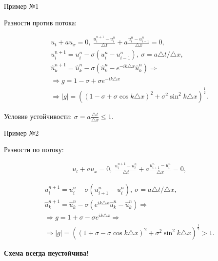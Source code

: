\documentclass[10pt,xcolor=pst,aspectratio=169]{beamer}
\begin{document}
\begin{frame}{Пример №1}

	\transdissolve[duration=0.1]
	\justifying
	\large

	Разности против потока:

	\[
		\begin{split}
			&u_{t} + a u_{x} = 0 , \: \frac{u^{n + 1}_{i} - u^{n}_{i}}{\triangle t} + a \frac{u^{n}_{i} - u^{n}_{i - 1}}{\triangle x} = 0 , \\
			&u^{n + 1}_{i} = u^{n}_{i} - \sigma \left( u^{n}_{i} - u^{n}_{i - 1} \right) , \: \sigma = a \triangle t / \triangle x , \\
			&\hat{u}^{n + 1}_{k} = \hat{u}^{n}_{k} - \sigma \left( \hat{u}^{n}_{k} - e^{- i k \triangle x} \hat{u}^{n}_{k} \right) \Rightarrow \\
			& \Rightarrow g = 1 - \sigma + \sigma e^{- i k \triangle x} \\
			& \Rightarrow |g| = \left( \left( 1 - \sigma + \sigma \cos k \triangle x \right)^{2} + \sigma^2 \sin^{2} k \triangle x \right)^{\frac{1}{2}}.
		\end{split}
	\]

    Условие устойчивости: $\sigma = a \frac{\triangle t}{\triangle x} \leq 1$.\\

\end{frame}

\begin{frame}{Пример №2}

	\transdissolve[duration=0.1]
	\justifying
	\large

	Разности по потоку:

	\[
		\begin{split}
			&u_{t} + a u_{x} = 0 , \: \frac{u^{n + 1}_{i} - u^{n}_{i}}{\triangle t} + a \frac{u^{n}_{i + 1} - u^{n}_{i}}{\triangle x} = 0,
		\end{split}
	\]

	\pause

	\[
		\begin{split}
			&u^{n + 1}_{i} = u^{n}_{i} - \sigma \left( u^{n}_{i + 1} - u^{n}_{i} \right), \: \sigma = a \triangle t / \triangle x, \\
			&\hat{u}^{n + 1}_{k} = \hat{u}^{n}_{k} - \sigma \left( e^{i k \triangle x} \hat{u}^{n}_{k} - \hat{u}^{n}_{k} \right) \Rightarrow \\
			& \Rightarrow g = 1 + \sigma - \sigma e^{i k \triangle x} \Rightarrow \\
			&\Rightarrow |g| = \left( \left( 1 + \sigma - \sigma \cos k \triangle x \right)^{2} + \sigma^2 \sin^{2} k \triangle x \right)^{\frac{1}{2}} > 1 .
		\end{split}
	\]

    \textbf{Схема всегда неустойчива!}\\

\end{frame}
\end{document}
